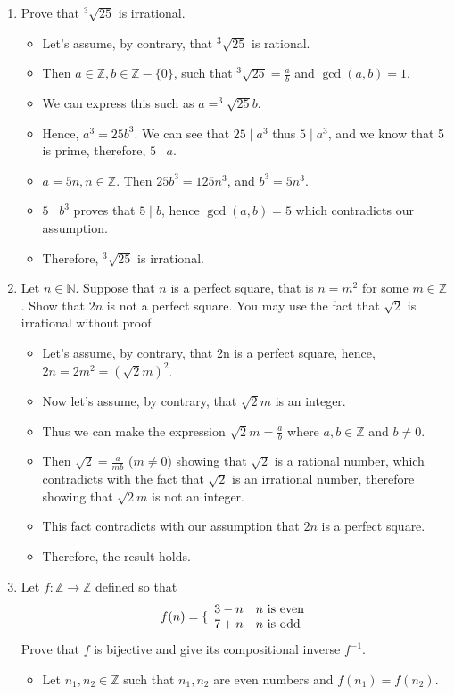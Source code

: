 \documentclass[letterpaper,12pt]{article}
\begin{document}
\begin{enumerate}
\begin{itemize}
\begin{itemize}
	\end{itemize}
\end{itemize}
\item Prove that $^3\sqrt{25}$ is irrational.
\begin{itemize}
	\item Let's assume, by contrary, that $^3\sqrt{25}$ is rational.
	\item Then $a \in \mathbb{Z},b\in \mathbb{Z} - \{0\}$, such that $^3\sqrt{25} = \frac{a}{b}$ and $\gcd(a,b) = 1$.
	\item We can express this such as $a = ^3\sqrt{25}b$.
	\item Hence, $a^3 = 25b^3$. We can see that $25 \mid a^3$ thus $5 \mid a^3$, and we know that 5 is prime, therefore, $5\mid a$.
	\item $a=5n,n\in \mathbb{Z}$. Then $25b^3 = 125n^3$, and $b^3=5n^3.$
	\item $5 \mid b^3$ proves that $5\mid b$, hence $\gcd(a,b) =5$ which contradicts our assumption.
	\item Therefore, $^3\sqrt{25} $ is irrational.
	\end{itemize}
\item Let $n \in \mathbb{N}$. Suppose that $n$ is a perfect square, that is $n = m^2$ for some $m \in \mathbb{Z}$. Show that $2n$ is not a perfect square. You may use the fact that $\sqrt{2}$ is irrational without proof.
\begin{itemize}
	\item Let's assume, by contrary, that 2n is a perfect square, hence, $2n = 2m^2 = (\sqrt{2}m)^2$.
	\item Now let's assume, by contrary, that $\sqrt{2}m$ is an integer.
	\item Thus we can make the expression $\sqrt{2}m = \frac{a}{b}$ where $a,b \in \mathbb{Z}$ and $b \neq 0$.
	\item Then $\sqrt{2} = \frac{a}{mb}$ ($m \neq 0$) showing that $\sqrt{2}$ is a rational number, which contradicts with the fact that $\sqrt{2}$ is an irrational number, therefore showing that $\sqrt{2}m$ is not an integer.
	\item This fact contradicts with our assumption that $2n$ is a perfect square.
	\item Therefore, the result holds. 
\end{itemize}
\item Let $f : \mathbb{Z} \rightarrow \mathbb{Z}$ defined so that \\
\begin{equation*}
	f(n) = \{ \begin{array}{ll}
 	3-n & n $ is even$ \\ 7+n &n $ is odd$
 \end{array}
\end{equation*}
Prove that $f$ is bijective and give its compositional inverse $f^{-1}$.
\begin{itemize}
	\item Let $n_1,n_2\in \mathbb{Z}$ such that $n_1,n_2$ are even numbers and $f(n_1)=f(n_2)$.
	

\end{itemize}
\end{enumerate}
\end{document}

